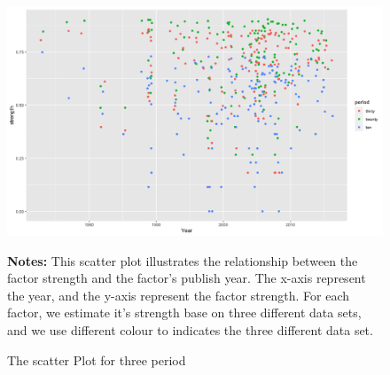 \begin{landscape}
	\begin{figure}[ht]
			\caption{The scatter Plot for three period}\label{figure:scatter}
		\includegraphics[width=\columnwidth]{scatter}
		\centering
					\begin{minipage}{\textwidth}
			{\footnotesize {\bf Notes:} This scatter plot illustrates the relationship between the factor strength and the factor's publish year. The x-axis represent the year, and the y-axis represent the factor strength. For each factor, we estimate it's strength base on three different data sets, and we use different colour to indicates the three different data set.}
		\end{minipage}
	\end{figure}
\end{landscape}


%
